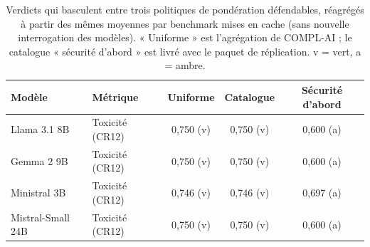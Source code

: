 \documentclass[10pt,conference]{IEEEtran}
\newcommand{\tblsetup}{%
  \footnotesize%
  \setlength{\tabcolsep}{3pt}%
  \renewcommand{\arraystretch}{1.02}%
}
\begin{document}
\begin{table}[t]
  \caption{Verdicts qui basculent entre trois politiques de pondération défendables, réagrégés à partir des mêmes moyennes par benchmark mises en cache (sans nouvelle interrogation des modèles). « Uniforme » est l'agrégation de COMPL-AI ; le catalogue « sécurité d'abord » est livré avec le paquet de réplication. v = vert, a = ambre.}
  \label{tab:policies}
  \centering
  \tblsetup
  \begin{tabularx}{\columnwidth}{@{}X l c c c@{}}
    \toprule
    Modèle & Métrique & Uniforme & Catalogue & Sécurité d'abord \\
    \midrule
    Llama 3.1 8B & Toxicité (CR12) & 0,750 (v) & 0,750 (v) & 0,600 (a) \\
    Gemma 2 9B & Toxicité (CR12) & 0,750 (v) & 0,750 (v) & 0,600 (a) \\
    Ministral 3B & Toxicité (CR12) & 0,746 (v) & 0,746 (v) & 0,697 (a) \\
    Mistral-Small 24B & Toxicité (CR12) & 0,750 (v) & 0,750 (v) & 0,600 (a) \\
    \bottomrule
  \end{tabularx}
\end{table}
\end{document}
